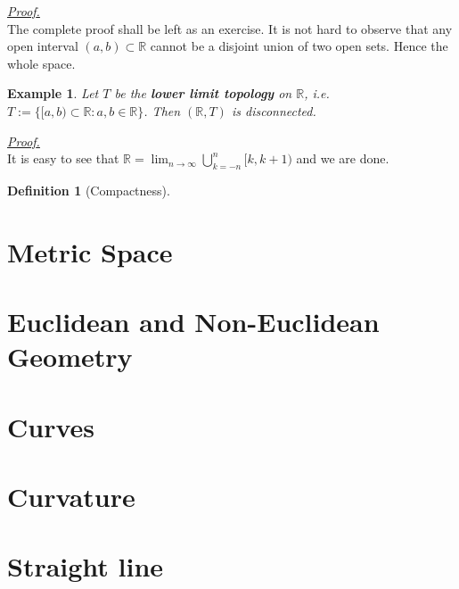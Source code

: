\documentclass[12pt]{article}
\newtheorem{definition}{Definition}[section]
\newtheorem*{example}{Example}
\renewenvironment{proof}[1][Proof]{\begin{snugshade*} \underline{\textit{{#1}.}}\\}{\hfill \qedsymbol \end{snugshade*}}
\begin{document}
    \begin{proof}
        The complete proof shall be left as an exercise. It is not hard to observe that any open interval $(a,b)\subset \mathbb{R}$ cannot be a disjoint union of two open sets. Hence the whole space.
    \end{proof}

    \begin{example}
        Let $T$ be the \textbf{lower limit topology} on $\mathbb{R}$, i.e. $T:=\{[a,b)\subset \mathbb{R}: a,b\in\mathbb{R}\}$. Then $(\mathbb{R},T)$ is disconnected.
    \end{example}

    \begin{proof}
        It is easy to see that $\mathbb{R}=\displaystyle \lim_{n\to \infty}\bigcup_{k=-n}^n [k,k+1)$ and we are done.
    \end{proof}

    \begin{definition}[Compactness]
        
    \end{definition}

    \section{Metric Space}

    \section{Euclidean and Non-Euclidean Geometry}

    \section{Curves}

    \section{Curvature}

    \section{Straight line}
    
\end{document}
